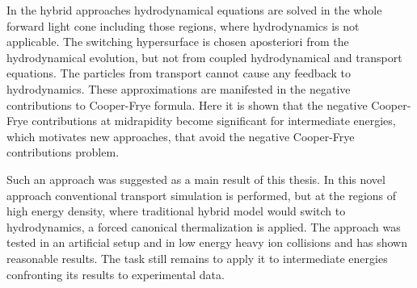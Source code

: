 In the hybrid approaches hydrodynamical equations are solved in the whole forward light
cone including those regions, where hydrodynamics is not applicable. The switching
hypersurface is chosen aposteriori from the hydrodynamical evolution, but not
from coupled hydrodynamical and transport equations. The particles from
transport cannot cause any feedback to hydrodynamics. These approximations are
manifested in the negative contributions to Cooper-Frye formula. Here it is shown that
the negative Cooper-Frye contributions at midrapidity become significant for
intermediate energies, which motivates new approaches, that avoid the negative
Cooper-Frye contributions problem.

Such an approach was suggested as a main result of this thesis. In this novel approach
conventional transport simulation is performed, but at the regions of high energy
density, where traditional hybrid model would switch to hydrodynamics, a forced
canonical thermalization is applied. The approach was tested in an artificial setup
and in low energy heavy ion collisions and has shown reasonable results. The task
still remains to apply it to intermediate energies confronting its results to
experimental data.



